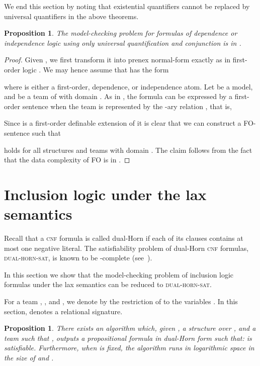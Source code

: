 \documentclass{article}
\theoremstyle{plain}
\newtheorem{proposition}[theorem]{Proposition}
\theoremstyle{definition}
\newcommand{\pb}[1]{\textsc{#1}}
\begin{document}
We end this section by noting that existential quantifiers cannot be replaced by universal quantifiers in the above theorems.

\begin{proposition}\label{forall+wedge} The model-checking problem for formulas of  dependence or independence  logic using only  universal quantification and conjunction is in .
\end{proposition}


\begin{proof} Given , we first transform it into prenex normal-form exactly as in first-order logic \cite{vaananen07}. We may hence assume that  has the form

where  is either a first-order, dependence, or independence atom. Let   be a model,  and   be a team of  with domain . As in   \cite{vaananen07}, the formula  can be expressed by a first-order sentence  when the team  is represented by the -ary relation , that is,

Since  is a first-order definable extension of   it is clear that we can construct a FO-sentence  such that 

holds for all structures  and teams  with domain . The claim follows from the fact that the data complexity of FO is in .
\end{proof}




\section{Inclusion logic under the lax semantics}

Recall that a \pb{cnf} formula  is called dual-Horn if each of its clauses contains at most one negative literal. The satisfiability problem of dual-Horn \pb{cnf} formulas, \pb{dual-horn-sat}, is known to be -complete (see~\cite{GareyJ1979}).  

 In this section we show that the model-checking problem of inclusion logic formulas under the lax semantics  can be reduced to \pb{dual-horn-sat}.
  
For a team , , and , we denote by  the restriction of  to the  variables . In this section,  denotes a relational signature.

  \begin{proposition}\label{FO inclusion lax}
  There exists an algorithm which, given 
   ,  a structure  over , and  a team  such that , outputs a propositional formula  in dual-Horn form such that:  is satisfiable.
Furthermore, when  is fixed, the algorithm runs in logarithmic space in the size of  and .
  \end{proposition}
  
\end{document}
